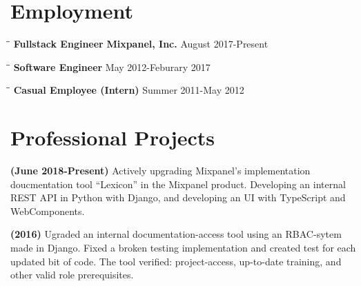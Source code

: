 \documentclass{res}
\begin{document}
 
\thispagestyle{empty} %
\address{ksiondag846@gmail.com\\
(520) 329-5081\\
\url{https://github.com/ksiondag}\\
Seattle, WA}


\begin{resume}
   
\section{Employment} 
\vspace{-0.1in} 
  \begin{tabbing}
    \hspace{2.3in}\= \hspace{2.6in}\= \kill
    {\bf Fullstack Engineer} \> {\bf Mixpanel, Inc.}     \>August 2017-Present
  \end{tabbing}\vspace{-5pt}

  \vspace{-20pt}\begin{tabbing}
    \hspace{2.3in}\= \hspace{2.6in}\= \kill
    {\bf Software Engineer}  \> May 2012-Feburary 2017
  \end{tabbing}\vspace{-5pt}
  \vspace{-20pt}\begin{tabbing}
    \hspace{2.3in}\= \hspace{2.6in}\= \kill
    {\bf Casual Employee (Intern)}  \> Summer 2011-May 2012
  \end{tabbing}\vspace{-5pt}

\section{Professional Projects}
  {\bf (June 2018-Present)} Actively upgrading Mixpanel's implementation doucmentation tool ``Lexicon''
  in the Mixpanel product. Developing an internal REST API in Python with Django, and developing an UI with
  TypeScript and WebComponents.

  {\bf (2016) } Ugraded an internal documentation-access tool using an RBAC-sytem made in Django.
  Fixed a broken testing implementation and created test for each updated bit of code. The tool
  verified: project-access, up-to-date training, and other valid role prerequisites. 


\end{resume}
\end{document}
